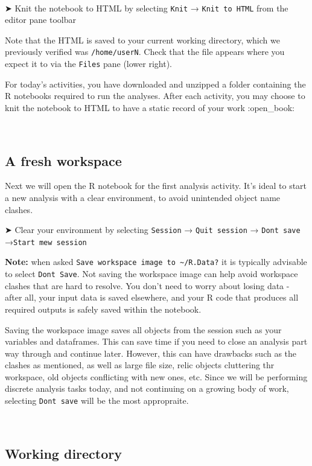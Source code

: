 \documentclass[
]{book}
\begin{document}
~

➤ Knit the notebook to HTML by selecting \texttt{Knit} → \texttt{Knit\ to\ HTML} from the editor pane toolbar

Note that the HTML is saved to your current working directory, which we previously verified was \texttt{/home/userN}. Check that the file appears where you expect it to via the \texttt{Files} pane (lower right).

For today's activities, you have downloaded and unzipped a folder containing the R notebooks required to run the analyses. After each activity, you may choose to knit the notebook to HTML to have a static record of your work :open\_book:

~

\hypertarget{a-fresh-workspace}{%
\subsection{A fresh workspace}\label{a-fresh-workspace}}

Next we will open the R notebook for the first analysis activity. It's ideal to start a new analysis with a clear environment, to avoid unintended object name clashes.

➤ Clear your environment by selecting \texttt{Session} → \texttt{Quit\ session} → \texttt{Dont\ save} →\texttt{Start\ mew\ session}

\textbf{Note:} when asked \texttt{Save\ workspace\ image\ to\ \textasciitilde{}/R.Data?} it is typically advisable to select \texttt{Don\textquotesingle{}t\ Save}. Not saving the workspace image can help avoid workspace clashes that are hard to resolve. You don't need to worry about losing data - after all, your input data is saved elsewhere, and your R code that produces all required outputs is safely saved within the notebook.

Saving the workspace image saves all objects from the session such as your variables and dataframes. This can save time if you need to close an analysis part way through and continue later. However, this can have drawbacks such as the clashes as mentioned, as well as large file size, relic objects cluttering thr workspace, old objects conflicting with new ones, etc. Since we will be performing discrete analysis tasks today, and not continuing on a growing body of work, selecting \texttt{Dont\ save} will be the most appropraite.

~

\hypertarget{working-directory}{%
\subsection{Working directory}\label{working-directory}}
\end{document}
